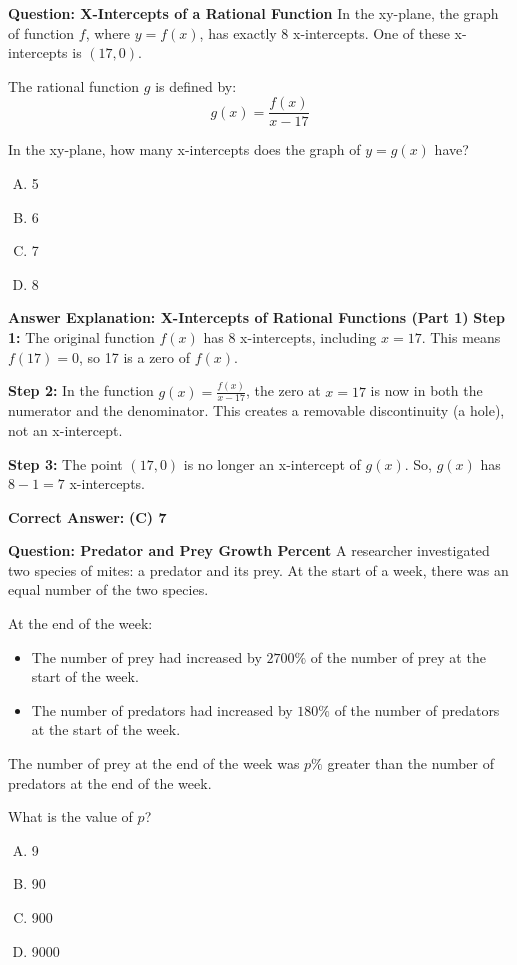 \documentclass{beamer}
\begin{document}
\begin{frame}{\textbf{Question: X-Intercepts of a Rational Function}}
In the xy-plane, the graph of function \( f \), where \( y = f(x) \), has exactly 8 x-intercepts. One of these x-intercepts is \( (17, 0) \).

The rational function \( g \) is defined by:  
\[
g(x) = \frac{f(x)}{x - 17}
\]

In the xy-plane, how many x-intercepts does the graph of \( y = g(x) \) have?

\begin{enumerate}[A.]
    \item 5
    \item 6
    \item 7
    \item 8
\end{enumerate}
\end{frame}


\begin{frame}{\textbf{Answer Explanation: X-Intercepts of Rational Functions (Part 1)}}
\textbf{Step 1:}  
The original function \( f(x) \) has 8 x-intercepts, including \( x = 17 \).  
This means \( f(17) = 0 \), so 17 is a zero of \( f(x) \).  

\pause

\textbf{Step 2:}  
In the function \( g(x) = \frac{f(x)}{x - 17} \), the zero at \( x = 17 \) is now in both the numerator and the denominator.  
This creates a removable discontinuity (a hole), not an x-intercept.

\textbf{Step 3:}  
The point \( (17, 0) \) is no longer an x-intercept of \( g(x) \).  
So, \( g(x) \) has \( 8 - 1 = \boxed{7} \) x-intercepts.

\textbf{Correct Answer:} \textbf{(C) 7}
\end{frame}


\begin{frame}{\textbf{Question: Predator and Prey Growth Percent}}
A researcher investigated two species of mites: a predator and its prey. At the start of a week, there was an equal number of the two species.

At the end of the week:
\begin{itemize}
    \item The number of prey had increased by \( 2700\% \) of the number of prey at the start of the week.
    \item The number of predators had increased by \( 180\% \) of the number of predators at the start of the week.
\end{itemize}

The number of prey at the end of the week was \( p\% \) greater than the number of predators at the end of the week.

What is the value of \( p \)?

\begin{enumerate}[A.]
    \item 9
    \item 90
    \item 900
    \item 9000
\end{enumerate}
\end{frame}
\end{document}
